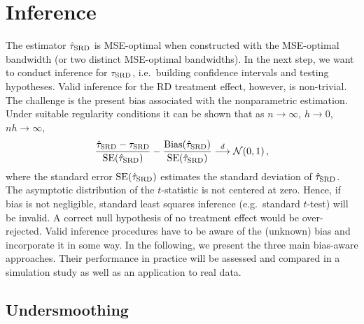 


\section{Inference} \label{sec:inference}

The estimator $\hat{\tau}_{\textup{SRD}}$ is MSE-optimal when constructed with the MSE-optimal bandwidth (or two distinct MSE-optimal bandwidths).
In the next step, we want to conduct inference for $\tau_{\textup{SRD}}$, i.e.\ building confidence intervals and testing hypotheses.
Valid inference for the RD treatment effect, however, is non-trivial.
The challenge is the present bias associated with the nonparametric estimation.
Under suitable regularity conditions \parencite[Lemma~A.1]{Calonico_2014} it can be shown that as $n \rightarrow \infty$, $h \rightarrow 0$, $nh \rightarrow \infty$,
\begin{equation} \label{eq:asymp-normal}
	\frac{\hat{\tau}_{\textup{SRD}} - \tau_{\textup{SRD}}}{\operatorname{SE}(\hat{\tau}_{\textup{SRD}})} - \frac{\operatorname{Bias}(\hat{\tau}_{\textup{SRD}})}{\operatorname{SE}(\hat{\tau}_{\textup{SRD}})} \overset{d}{\longrightarrow} \mathcal{N}(0, 1) \,,
\end{equation}
where the standard error $\operatorname{SE}(\hat{\tau}_{\textup{SRD}})$ estimates the standard deviation of $\hat{\tau}_{\textup{SRD}}$.
The asymptotic distribution of the $t$-statistic is not centered at zero.    
Hence, if bias is not negligible, standard least squares inference (e.g.\ standard $t$-test) will be invalid.
A correct null hypothesis of no treatment effect would be over-rejected. 
Valid inference procedures have to be aware of the (unknown) bias and incorporate it in some way.
In the following, we present the three main bias-aware approaches.
Their performance in practice will be assessed and compared in a simulation study as well as an application to real data.

\subsection{Undersmoothing}

